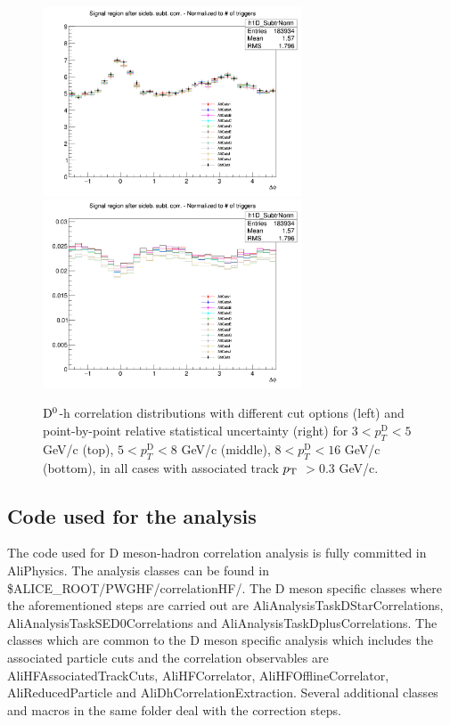 \begin{figure}[!htp]
{\includegraphics[width=0.47\linewidth, height=5.6cm]{figures/Cut_Optimiz_D0/AzimCorrDistr_Dzero_Canvas_PtIntBins9to10_PoolInt_thr03to99_Superimp.png}}
{\includegraphics[width=0.47\linewidth, height=5.6cm]{figures/Cut_Optimiz_D0/Uncertanty_AzimCorrDistr_Dzero_Canvas_PtIntBins9to10_PoolInt_thr03to99.png}}

\caption{${\rm D^0}$-h correlation distributions with different cut options (left) and point-by-point relative statistical uncertainty (right) for $3< p_{T}^{\text{D}}< 5$ GeV/c (top), $5< p_{T}^{\text{D}}< 8$ GeV/c (middle), $8< p_{T}^{\text{D}}< 16$ GeV/c (bottom), in all cases with associated track $p_{\rm T}$ $> 0.3$ GeV/c.}
\label{fig:cutoptD0}
\end{figure}

\subsection{Code used for the analysis}
The code used for D meson-hadron correlation analysis is fully committed in AliPhysics. The analysis classes can be found in
\$ALICE\_ROOT/PWGHF/correlationHF/.  The  D meson specific classes where the aforementioned steps are carried out are
AliAnalysisTaskDStarCorrelations, AliAnalysisTaskSED0Correlations and AliAnalysisTaskDplusCorrelations. The classes which are common to the D meson specific analysis which includes the associated particle cuts and the correlation observables are AliHFAssociatedTrackCuts, AliHFCorrelator, AliHFOfflineCorrelator, AliReducedParticle and AliDhCorrelationExtraction. Several additional classes and macros in the same folder deal with the correction steps.

